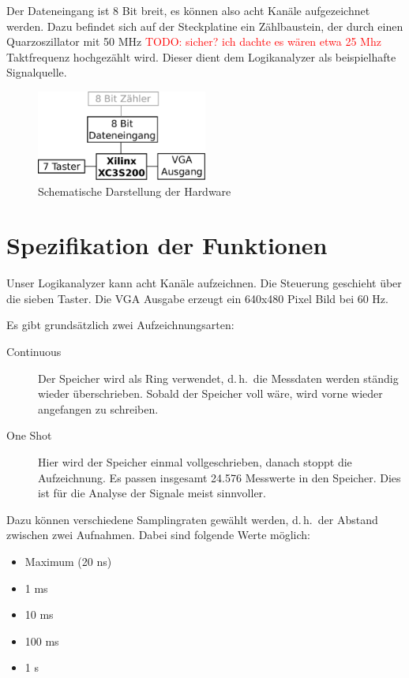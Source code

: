 \documentclass[IN,ngerman,utf8,12pt]{tumbook}
\newcommand\todo[1]{\textcolor{red}{TODO: #1}}
\newcommand{\dah}{d.\,h.\ }
\begin{document}
Der Dateneingang ist 8 Bit breit, es können also acht Kanäle aufgezeichnet werden.
Dazu befindet sich auf der Steckplatine ein Zählbaustein, der durch einen Quarzoszillator mit 50 MHz \todo{sicher? ich dachte es wären etwa 25 Mhz} Taktfrequenz hochgezählt wird.
Dieser dient dem Logikanalyzer als beispielhafte Signalquelle.

\begin{figure}
    \centerline{
        \includegraphics[width=0.5\textwidth]{img/hardware}
    }
    \caption{Schematische Darstellung der Hardware}
\end{figure}

\chapter{Spezifikation der Funktionen}

Unser Logikanalyzer kann acht Kanäle aufzeichnen.
Die Steuerung geschieht über die sieben Taster.
Die VGA Ausgabe erzeugt ein 640x480 Pixel Bild bei 60 Hz.

Es gibt grundsätzlich zwei Aufzeichnungsarten:

\begin{description}
    \item[Continuous] Der Speicher wird als Ring verwendet, \dah die Messdaten werden ständig wieder überschrieben.
        Sobald der Speicher voll wäre, wird vorne wieder angefangen zu schreiben.
    \item[One Shot] Hier wird der Speicher einmal vollgeschrieben, danach stoppt die Aufzeichnung.
        Es passen insgesamt 24.576 Messwerte in den Speicher.
        Dies ist für die Analyse der Signale meist sinnvoller.
\end{description}

Dazu können verschiedene Samplingraten gewählt werden, \dah der Abstand zwischen zwei Aufnahmen.
Dabei sind folgende Werte möglich:

\begin{itemize}
    \item Maximum (20 ns)
    \item 1 ms
    \item 10 ms
    \item 100 ms
    \item 1 s
\end{itemize}
\end{document}
